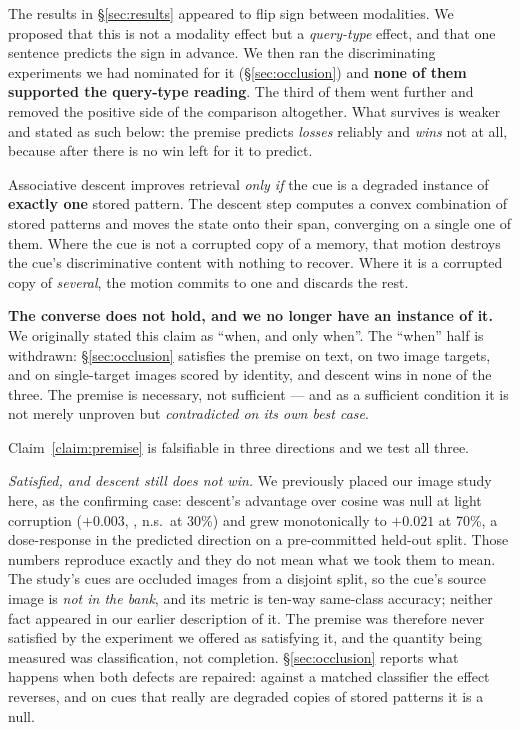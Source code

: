 \label{sec:taxonomy}

The results in \S\ref{sec:results} appeared to flip sign between modalities. We proposed
that this is not a modality effect but a \emph{query-type} effect, and that one sentence
predicts the sign in advance. We then ran the discriminating experiments we had nominated
for it (\S\ref{sec:occlusion}) and \textbf{none of them supported the query-type reading}.
The third of them went further and removed the positive side of the comparison altogether.
What survives is weaker and stated as such below: the premise predicts \emph{losses}
reliably and \emph{wins} not at all, because after  there is no win left for it
to predict.

\begin{claimbox}
\label{claim:premise}
Associative descent improves retrieval \emph{only if} the cue is a degraded instance of
\textbf{exactly one} stored pattern. The descent step computes a convex combination of
stored patterns and moves the state onto their span, converging on a single one of them.
Where the cue is not a corrupted copy of a memory, that motion destroys the cue's
discriminative content with nothing to recover. Where it is a corrupted copy of
\emph{several}, the motion commits to one and discards the rest.

\textbf{The converse does not hold, and we no longer have an instance of it.} We
originally stated this claim as ``when, and only when''. The ``when'' half is withdrawn:
\S\ref{sec:occlusion} satisfies the premise on text, on two image targets, and on
single-target images scored by identity, and descent wins in none of the three. The premise
is necessary, not sufficient --- and as a sufficient condition it is not merely unproven
but \emph{contradicted on its own best case}.
\end{claimbox}

Claim~\ref{claim:premise} is falsifiable in three directions and we test all three.

\emph{Satisfied, and descent still does not win.} We previously placed our image study
here, as the confirming case: descent's advantage over cosine was null at light corruption
($+0.003$, , n.s.\ at 30\%) and grew monotonically to $+0.021$
 at 70\%, a dose-response in the predicted direction on a pre-committed
held-out split. Those numbers reproduce exactly and they do not mean what we took them to
mean. The study's cues are occluded images from a disjoint split, so the cue's source image
is \emph{not in the bank}, and its metric is ten-way same-class accuracy; neither fact
appeared in our earlier description of it. The premise was therefore never satisfied by the
experiment we offered as satisfying it, and the quantity being measured was classification,
not completion. \S\ref{sec:occlusion} reports what happens when both defects are repaired:
against a matched classifier the effect reverses, and on cues that really are degraded
copies of stored patterns it is a null.

